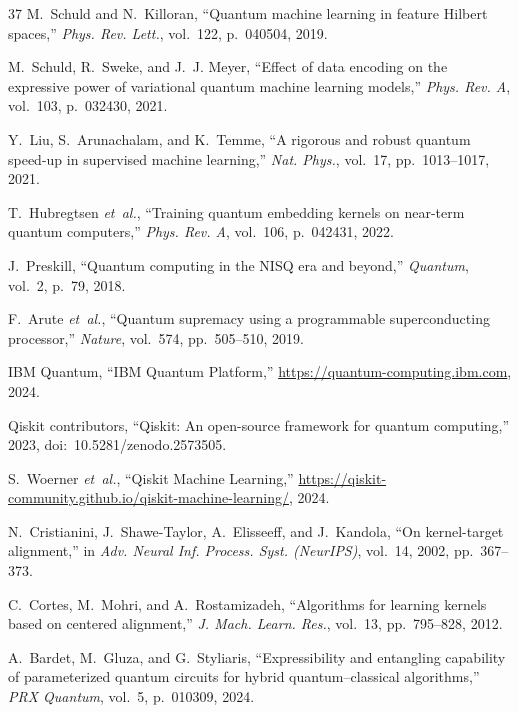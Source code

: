\documentclass[journal]{IEEEtran}
\begin{document}
\begin{thebibliography}{37}
  M.~Schuld and N.~Killoran, ``Quantum machine learning in feature
    Hilbert spaces,'' \emph{Phys. Rev. Lett.}, vol.~122,
    p.~040504, 2019.

  M.~Schuld, R.~Sweke, and J.~J. Meyer, ``Effect of data encoding on
    the expressive power of variational quantum machine learning
    models,'' \emph{Phys. Rev. A}, vol.~103, p.~032430, 2021.

  Y.~Liu, S.~Arunachalam, and K.~Temme, ``A rigorous and robust
    quantum speed-up in supervised machine learning,''
  \emph{Nat. Phys.}, vol.~17, pp.~1013--1017, 2021.

  T.~Hubregtsen \emph{et~al.},
  ``Training quantum embedding kernels on near-term quantum
    computers,'' \emph{Phys. Rev. A}, vol.~106, p.~042431, 2022.

  J.~Preskill, ``Quantum computing in the NISQ era and beyond,''
  \emph{Quantum}, vol.~2, p.~79, 2018.

  F.~Arute \emph{et~al.}, ``Quantum supremacy using a programmable
    superconducting processor,'' \emph{Nature}, vol.~574,
    pp.~505--510, 2019.

  IBM Quantum, ``IBM Quantum Platform,''
  \url{https://quantum-computing.ibm.com}, 2024.

  Qiskit contributors, ``Qiskit: An open-source framework for
    quantum computing,'' 2023,
    doi:~10.5281/zenodo.2573505.

  S.~Woerner \emph{et~al.}, ``Qiskit Machine Learning,''
  \url{https://qiskit-community.github.io/qiskit-machine-learning/},
  2024.

  N.~Cristianini, J.~Shawe-Taylor, A.~Elisseeff, and J.~Kandola,
  ``On kernel-target alignment,'' in \emph{Adv. Neural Inf. Process.
    Syst. (NeurIPS)}, vol.~14, 2002, pp.~367--373.

  C.~Cortes, M.~Mohri, and A.~Rostamizadeh,
  ``Algorithms for learning kernels based on centered alignment,''
  \emph{J. Mach. Learn. Res.}, vol.~13, pp.~795--828, 2012.

  A.~Bardet, M.~Gluza, and G.~Styliaris,
  ``Expressibility and entangling capability of parameterized
    quantum circuits for hybrid quantum--classical algorithms,''
  \emph{PRX Quantum}, vol.~5, p.~010309, 2024.


\end{thebibliography}
\end{document}
